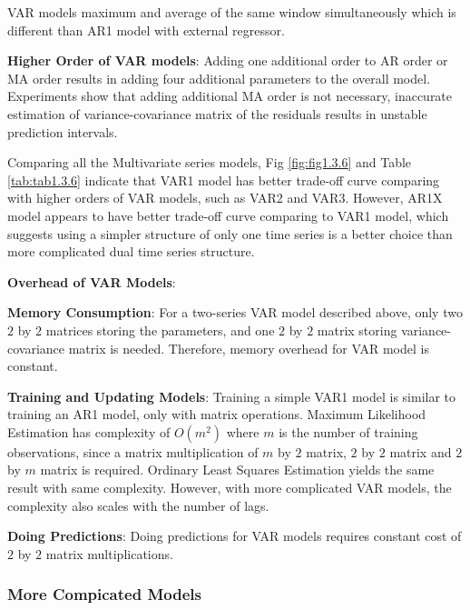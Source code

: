 \documentclass{article}
\begin{document}
\begin{flushleft}
VAR models maximum and average of the same window simultaneously which is different than AR1 model with external regressor.
\end{flushleft}

\begin{flushleft}
\textbf{Higher Order of VAR models}: Adding one additional order to AR order or MA order results in adding four additional parameters to the overall model. Experiments show that adding additional MA order is not necessary, inaccurate estimation of variance-covariance matrix of the residuals results in unstable prediction intervals.
\end{flushleft}

\begin{flushleft}
Comparing all the Multivariate series models, Fig \ref{fig:fig1.3.6} and Table \ref{tab:tab1.3.6} indicate that VAR1 model has better trade-off curve comparing with higher orders of VAR models, such as VAR2 and VAR3. However, AR1X model appears to have better trade-off curve comparing to VAR1 model, which suggests using a simpler structure of only one time series is a better choice than more complicated dual time series structure.
\end{flushleft}

\textbf{Overhead of VAR Models}:
\begin{flushleft}
\textbf{Memory Consumption}: For a two-series VAR model described above, only two $2$ by $2$ matrices storing the parameters, and one $2$ by $2$ matrix storing variance-covariance matrix is needed. Therefore, memory overhead for VAR model is constant.

\textbf{Training and Updating Models}: Training a simple VAR1 model is similar to training an AR1 model, only with matrix operations. Maximum Likelihood Estimation has complexity of $O(m^2)$ where $m$ is the number of training observations, since a matrix multiplication of $m$ by $2$ matrix, $2$ by $2$ matrix and $2$ by $m$ matrix is required. Ordinary Least Squares Estimation yields the same result with same complexity.
However, with more complicated VAR models, the complexity also scales with the number of lags. 

\textbf{Doing Predictions}: Doing predictions for VAR models requires constant cost of $2$ by $2$ matrix multiplications.
\end{flushleft}

\subsubsection{More Compicated Models}
\end{document}
